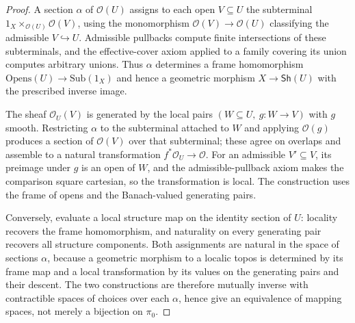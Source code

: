 \documentclass[12pt]{amsart}
\theoremstyle{definition}
\theoremstyle{remark}
\numberwithin{equation}{section}
\newcommand{\Sh}{\mathsf{Sh}}
\begin{document}
\begin{proof}
A section $\alpha$ of $\mathcal O(U)$ assigns to each open
$V\subseteq U$ the subterminal
$1_X\times_{\mathcal O(U)}\mathcal O(V)$, using the monomorphism
$\mathcal O(V)\to\mathcal O(U)$ classifying the admissible
$V\hookrightarrow U$. Admissible pullbacks compute finite
intersections of these subterminals, and the effective-cover axiom
applied to a family covering its union computes arbitrary unions.
Thus $\alpha$ determines a frame homomorphism
$\mathrm{Opens}(U)\to\mathrm{Sub}(1_X)$ and hence a geometric
morphism $X\to\Sh(U)$ with the prescribed inverse image.

The sheaf $\mathcal O_U(V)$ is generated by the local pairs
$(W\subseteq U,\ g\colon W\to V)$ with $g$ smooth. Restricting
$\alpha$ to the subterminal attached to $W$ and applying
$\mathcal O(g)$ produces a section of $\mathcal O(V)$ over that
subterminal; these agree on overlaps and assemble to a natural
transformation $f^{*}\mathcal O_U\to\mathcal O$. For an admissible
$V'\subseteq V$, its preimage under $g$ is an open of $W$, and the
admissible-pullback axiom makes the comparison square cartesian, so
the transformation is local. The construction uses the frame
of opens and the Banach-valued generating pairs.

Conversely, evaluate a local structure map on the identity section
of $U$: locality recovers the frame homomorphism, and naturality on
every generating pair recovers all structure components. Both
assignments are natural in the space of sections $\alpha$, because a
geometric morphism to a localic topos is determined by its frame map
and a local transformation by its values on the generating pairs and
their descent. The two constructions are therefore mutually inverse
with contractible spaces of choices over each $\alpha$, hence give
an equivalence of mapping spaces, not merely a bijection on
$\pi_0$.
\end{proof}
\end{document}
